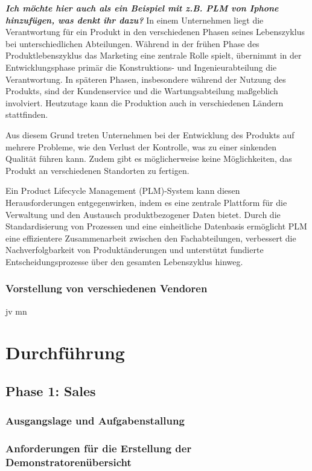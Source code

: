 \documentclass[a4paper, 12pt]{scrartcl}
\begin{document}
	\textbf{\textit{Ich möchte hier auch als ein Beispiel mit z.B. PLM von Iphone hinzufügen, was denkt ihr dazu?}}
	\newline 
	\newline
	In einem Unternehmen liegt die Verantwortung für ein Produkt in den verschiedenen Phasen seines Lebenszyklus bei unterschiedlichen Abteilungen. Während in der frühen Phase des Produktlebenszyklus das Marketing eine zentrale Rolle spielt, übernimmt in der Entwicklungsphase primär die Konstruktions- und Ingenieurabteilung die Verantwortung. In späteren Phasen, insbesondere während der Nutzung des Produkts, sind der Kundenservice und die Wartungsabteilung maßgeblich involviert. Heutzutage kann die Produktion auch in verschiedenen Ländern stattfinden.

	Aus diesem Grund treten Unternehmen bei der Entwicklung des Produkts auf mehrere Probleme, wie den Verlust der Kontrolle, was zu einer sinkenden Qualität führen kann. Zudem gibt es möglicherweise keine Möglichkeiten, das Produkt an verschiedenen Standorten zu fertigen\cite{stark2011product}.
	
	Ein Product Lifecycle Management (PLM)-System kann diesen Herausforderungen entgegenwirken, indem es eine zentrale Plattform für die Verwaltung und den Austausch produktbezogener Daten bietet. Durch die Standardisierung von Prozessen und eine einheitliche Datenbasis ermöglicht PLM eine effizientere Zusammenarbeit zwischen den Fachabteilungen, verbessert die Nachverfolgbarkeit von Produktänderungen und unterstützt fundierte Entscheidungsprozesse über den gesamten Lebenszyklus hinweg\cite{ozturk2019product}.
	\subsubsection{Vorstellung von verschiedenen Vendoren}
jv mn 
	\newpage
	\section{Durchführung}
	\subsection{Phase 1: Sales} 
	\subsubsection{Ausgangslage und Aufgabenstallung} %
	\subsubsection{Anforderungen für die Erstellung der Demonstratorenübersicht} %
\end{document}
